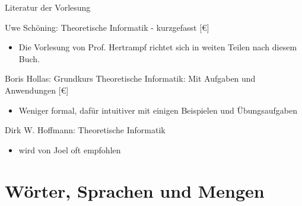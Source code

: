 \documentclass[10pt]{beamer}
\begin{document}
\begin{frame}{Literatur der Vorlesung}
    \small{Uwe Schöning: Theoretische Informatik - kurzgefasst [€]\\
    \begin{itemize}
        \item Die Vorlesung von Prof. Hertrampf richtet sich in weiten Teilen nach diesem Buch.
    \end{itemize}
    Boris Hollas: Grundkurs Theoretische Informatik: Mit Aufgaben und Anwendungen [€]\\
    \begin{itemize}
        \item Weniger formal, dafür intuitiver mit einigen Beispielen und Übungsaufgaben
    \end{itemize}
    Dirk W. Hoffmann: Theoretische Informatik
    \begin{itemize}
        \item wird von Joel oft empfohlen
    \end{itemize}}
    
\end{frame}

\section{Wörter, Sprachen und Mengen}
\end{document}
